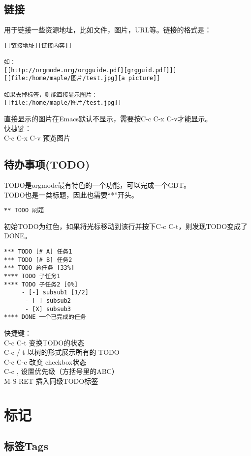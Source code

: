 \documentclass[11pt]{article}
\begin{document}
\subsection{链接}
\label{sec-1-5}

用于链接一些资源地址，比如文件，图片，URL等。链接的格式是：
\begin{verbatim}
[[链接地址][链接内容]]

如：
[[http://orgmode.org/orgguide.pdf][grgguid.pdf]]]
[[file:/home/maple/图片/test.jpg][a picture]]

如果去掉标签，则能直接显示图片：
[[file:/home/maple/图片/test.jpg]]
\end{verbatim}
直接显示的图片在Emacs默认不显示，需要按C-c C-x C-v才能显示。\\
快捷键：\\
C-c C-x C-v 预览图片\\

\subsection{待办事项(TODO)}
\label{sec-1-6}

TODO是orgmode最有特色的一个功能，可以完成一个GDT。\\
TODO也是一类标题，因此也需要“*”开头。
\begin{verbatim}
** TODO 刷题
\end{verbatim}
初始TODO为红色，如果将光标移动到该行并按下C-c C-t，则发现TODO变成了DONE。
\begin{verbatim}
*** TODO [# A] 任务1
*** TODO [# B] 任务2
*** TODO 总任务 [33%]
**** TODO 子任务1
**** TODO 子任务2 [0%]
     - [-] subsub1 [1/2]
      - [ ] subsub2
      - [X] subsub3
**** DONE 一个已完成的任务
\end{verbatim}
快捷键：\\
C-c C-t 变换TODO的状态 \\
C-c / t 以树的形式展示所有的 TODO \\
C-c C-c 改变 checkbox状态 \\
C-c , 设置优先级（方括号里的ABC） \\
M-S-RET 插入同级TODO标签\\

\section{标记}
\label{sec-2}

\subsection{标签Tags}
\label{sec-2-1}
\end{document}
